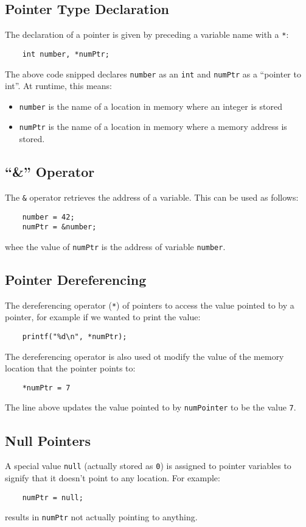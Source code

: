 \subsection{Pointer Type Declaration}
The declaration of a pointer is given by preceding a variable name with a \verb|*|:
\begin{verbatim}
    int number, *numPtr;
\end{verbatim}
The above code snipped declares \verb|number| as an \verb|int| and \verb|numPtr| as a ``pointer to int''. At runtime, this means:
\begin{itemize}
    \item \verb|number| is the name of a location in memory where an integer is stored
    \item \verb|numPtr| is the name of a location in memory where a memory address is stored.
\end{itemize}

\subsection{``\&'' Operator}
The \verb|&| operator retrieves the address of a variable. This can be used as follows:
\begin{verbatim}
    number = 42;
    numPtr = &number;
\end{verbatim}
whee the value of \verb|numPtr| is the address of variable \verb|number|. 

\subsection{Pointer Dereferencing}
The dereferencing operator (\verb|*|) of pointers to access the value pointed to by a pointer, for example if we wanted to print the value:
\begin{verbatim}
    printf("%d\n", *numPtr);
\end{verbatim}
The dereferencing operator is also used ot modify the value of the memory location that the pointer points to:
\begin{verbatim}
    *numPtr = 7
\end{verbatim}
The line above updates the value pointed to by \verb|numPointer| to be the value \verb|7|. 

\subsection{Null Pointers}
A special value \verb|null| (actually stored as \verb|0|) is assigned to pointer variables to signify that it doesn't point to any location. For example:
\begin{verbatim}
    numPtr = null;
\end{verbatim}
results in \verb|numPtr| not actually pointing to anything.

